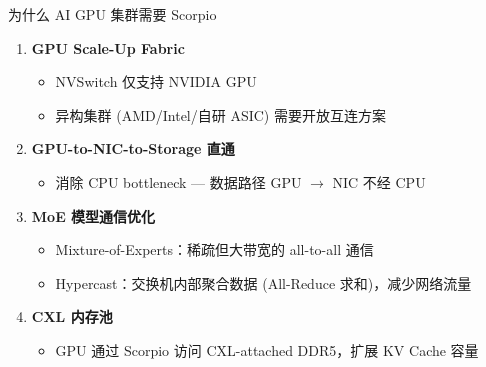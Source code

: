 \documentclass[aspectratio=169, 10pt, UTF8]{ctexbeamer}
\begin{document}
\begin{frame}{为什么 AI GPU 集群需要 Scorpio}
  \begin{enumerate}
    \item \textbf{GPU Scale-Up Fabric}
    \begin{itemize}
      \item NVSwitch 仅支持 NVIDIA GPU
      \item 异构集群 (AMD/Intel/自研 ASIC) 需要开放互连方案
    \end{itemize}

    \item \textbf{GPU-to-NIC-to-Storage 直通}
    \begin{itemize}
      \item 消除 CPU bottleneck — 数据路径 GPU $\to$ NIC 不经 CPU
    \end{itemize}

    \item \textbf{MoE 模型通信优化}
    \begin{itemize}
      \item Mixture-of-Experts：稀疏但大带宽的 all-to-all 通信
      \item Hypercast：交换机内部聚合数据 (All-Reduce 求和)，减少网络流量
    \end{itemize}

    \item \textbf{CXL 内存池}
    \begin{itemize}
      \item GPU 通过 Scorpio 访问 CXL-attached DDR5，扩展 KV Cache 容量
    \end{itemize}
  \end{enumerate}
\end{frame}
\end{document}
